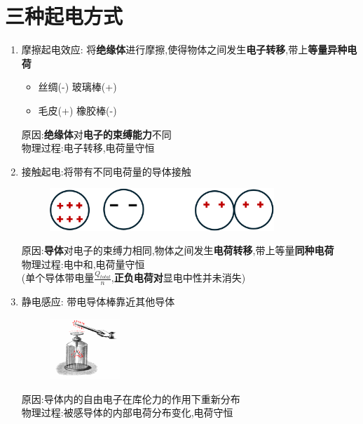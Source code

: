 \documentclass{article}
\begin{document}
    \section{三种起电方式}
    \begin{enumerate}
        \item 摩擦起电效应: 将\textbf{绝缘体}进行摩擦,使得物体之间发生\textbf{电子转移},带上\textbf{等量异种电荷}
            \begin{itemize}[label={}]
                \item 丝绸(-) 玻璃棒(+)   
                \item 毛皮(+) 橡胶棒(-)   
            \end{itemize}
        原因:\textbf{绝缘体}对\textbf{电子的束缚能力}不同   \\
        物理过程:电子转移,电荷量守恒

        \item 接触起电:将带有不同电荷量的导体接触
        \begin{figure}[h]
            \centering
            \includegraphics[width=0.8\textwidth]{./pictures/1.png}
        \end{figure}

        原因:\textbf{导体}对电子的束缚力相同,物体之间发生\textbf{电荷转移},带上等量\textbf{同种电荷}  \\    
        物理过程:电中和,电荷量守恒  \\
        (单个导体带电量$\frac{Q_{total}}{n}$,\textbf{正负电荷对}显电中性并未消失)

        \newpage

        \item 静电感应: 带电导体棒靠近其他导体
        \begin{figure}[h]
            \centering
            \includegraphics[width=0.25\textwidth]{./pictures/2.png}
        \end{figure}

        原因:导体内的自由电子在库伦力的作用下重新分布 \\
        物理过程:被感导体的内部电荷分布变化,电荷守恒        
    \end{enumerate}
\end{document}
